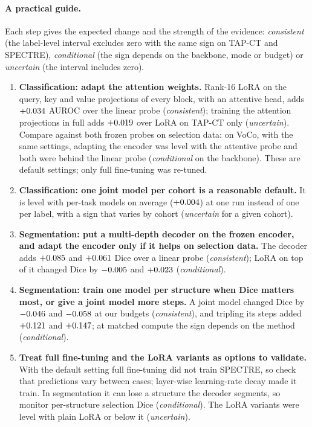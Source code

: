 \paragraph{A practical guide.} Each step gives the expected change and the strength of the evidence: \emph{consistent} (the label-level interval excludes zero with the same sign on TAP-CT and SPECTRE), \emph{conditional} (the sign depends on the backbone, mode or budget) or \emph{uncertain} (the interval includes zero).
\begin{enumerate}\setlength{\itemsep}{1pt}
  \item \textbf{Classification: adapt the attention weights.} Rank-16 LoRA on the query, key and value projections of every block, with an attentive head, adds $+0.034$ AUROC over the linear probe (\emph{consistent}); training the attention projections in full adds $+0.019$ over LoRA on TAP-CT only (\emph{uncertain}). Compare against both frozen probes on selection data: on VoCo, with the same settings, adapting the encoder was level with the attentive probe and both were behind the linear probe (\emph{conditional} on the backbone). These are default settings; only full fine-tuning was re-tuned.
  \item \textbf{Classification: one joint model per cohort is a reasonable default.} It is level with per-task models on average ($+0.004$) at one run instead of one per label, with a sign that varies by cohort (\emph{uncertain} for a given cohort).
  \item \textbf{Segmentation: put a multi-depth decoder on the frozen encoder, and adapt the encoder only if it helps on selection data.} The decoder adds $+0.085$ and $+0.061$ Dice over a linear probe (\emph{consistent}); LoRA on top of it changed Dice by $-0.005$ and $+0.023$ (\emph{conditional}).
  \item \textbf{Segmentation: train one model per structure when Dice matters most, or give a joint model more steps.} A joint model changed Dice by $-0.046$ and $-0.058$ at our budgets (\emph{consistent}), and tripling its steps added $+0.121$ and $+0.147$; at matched compute the sign depends on the method (\emph{conditional}).
  \item \textbf{Treat full fine-tuning and the LoRA variants as options to validate.} With the default setting full fine-tuning did not train SPECTRE, so check that predictions vary between cases; layer-wise learning-rate decay made it train. In segmentation it can lose a structure the decoder segments, so monitor per-structure selection Dice (\emph{conditional}). The LoRA variants were level with plain LoRA or below it (\emph{uncertain}).
\end{enumerate}

